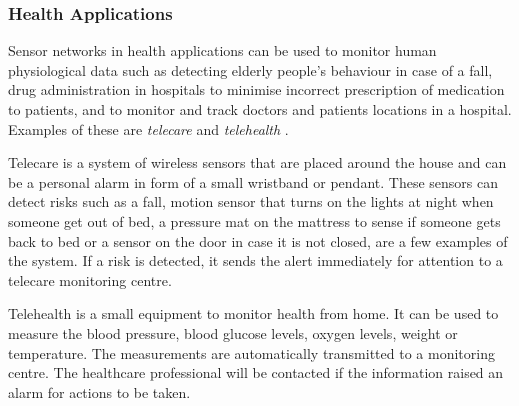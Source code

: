 
\subsubsection{Health Applications}
Sensor networks in health applications can be used to monitor human physiological data such as detecting elderly people's behaviour in case of a fall, drug administration \cite{telemonitoring} in hospitals to minimise incorrect prescription of medication to patients, and to monitor and track doctors and patients locations in a hospital. Examples of these are \textit{telecare} and \textit{telehealth} \cite{telehealth}.

Telecare is a system of wireless sensors that are placed around the house and can be a personal alarm in form of a small wristband or pendant. These sensors can detect risks such as a fall, motion sensor that turns on the lights at night when someone get out of bed, a pressure mat on the mattress to sense if someone gets back to bed or a sensor on the door in case it is not closed, are a few examples of the system. If a risk is detected, it sends the alert immediately for attention to a telecare monitoring centre. 

Telehealth is a small equipment to monitor health from home. It can be used to measure the blood pressure, blood glucose levels, oxygen levels, weight or temperature. The measurements are automatically transmitted to a monitoring centre. The healthcare professional will be contacted if the information raised an alarm for actions to be taken. 



